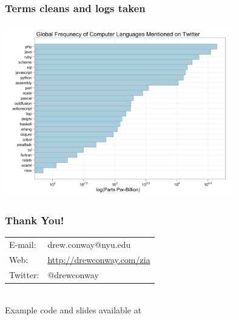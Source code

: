 \documentclass[xcolor=dvipsnames, 9pt]{beamer}
\begin{document}
\begin{frame}[fragile]
    \frametitle{Terms cleans and logs taken}
    \includegraphics[width=10cm]{images/lang_pop3.png}
\end{frame}


\begin{frame}[fragile]
    \frametitle{Thank You!}
    \begin{tabular}{ll}
        E-mail: & drew.conway@nyu.edu \\
        Web:    & \url{http://drewconway.com/zia} \\
        Twitter:& @drewconway
    \end{tabular}
    \vspace{2cm} \\
    Example code and slides available at \url{}
\end{frame}
\end{document}
